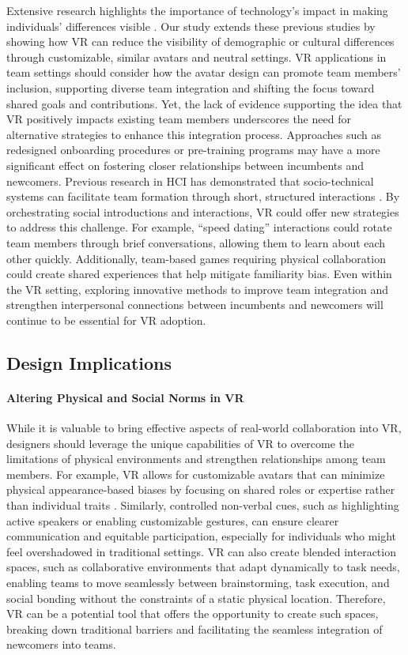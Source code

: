 Extensive research highlights the importance of technology's impact in making individuals' differences visible \cite{gomez2020impact,carte2004capabilities}. Our study extends these previous studies by showing how VR can reduce the visibility of demographic or cultural differences through customizable, similar avatars and neutral settings. VR applications in team settings should consider how the avatar design can promote team members' inclusion, supporting diverse team integration and shifting the focus toward shared goals and contributions. Yet, the lack of evidence supporting the idea that VR positively impacts existing team members underscores the need for alternative strategies to enhance this integration process. Approaches such as redesigned onboarding procedures or pre-training programs may have a more significant effect on fostering closer relationships between incumbents and newcomers. Previous research in HCI has demonstrated that socio-technical systems can facilitate team formation through short, structured interactions \cite{umbelino2021prototeams, lykourentzou2017team}. By orchestrating social introductions and interactions, VR could offer new strategies to address this challenge. For example, ``speed dating'' interactions could rotate team members through brief conversations, allowing them to learn about each other quickly. Additionally, team-based games requiring physical collaboration could create shared experiences that help mitigate familiarity bias. Even within the VR setting, exploring innovative methods to improve team integration and strengthen interpersonal connections between incumbents and newcomers will continue to be essential for VR adoption.

\subsection{Design Implications}

\paragraph{Altering Physical and Social Norms in VR}
While it is valuable to bring effective aspects of real-world collaboration into VR, designers should leverage the unique capabilities of VR to overcome the limitations of physical environments and strengthen relationships among team members. For example, VR allows for customizable avatars that can minimize physical appearance-based biases by focusing on shared roles or expertise rather than individual traits \cite{GatherTown, FrameVR}. Similarly, controlled non-verbal cues, such as highlighting active speakers or enabling customizable gestures, can ensure clearer communication and equitable participation, especially for individuals who might feel overshadowed in traditional settings. VR can also create blended interaction spaces, such as collaborative environments that adapt dynamically to task needs, enabling teams to move seamlessly between brainstorming, task execution, and social bonding without the constraints of a static physical location. Therefore, VR can be a potential tool that offers the opportunity to create such spaces, breaking down traditional barriers and facilitating the seamless integration of newcomers into teams. 
 
